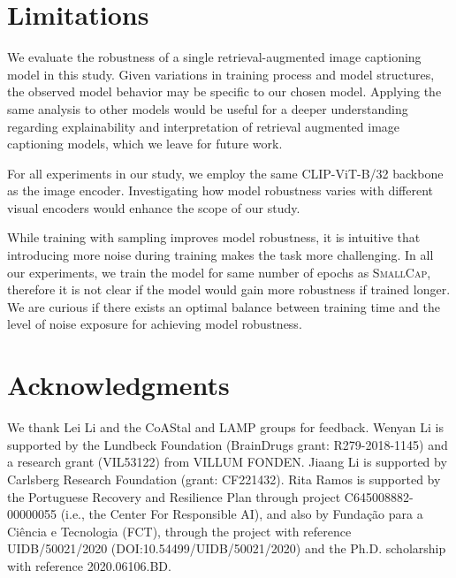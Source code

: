 \section*{Limitations}
We evaluate the robustness of a single retrieval-augmented image captioning model in this study. Given variations in training process and model structures, the observed model behavior may be specific to our chosen model. Applying the same analysis to other models  would be useful for a deeper understanding regarding explainability and interpretation of retrieval augmented image captioning models, which we leave for future work. 

For all experiments in our study, we employ the same  CLIP-ViT-B/32 backbone as the image encoder. Investigating how model robustness varies with different visual encoders would enhance the scope of our study.

While training with sampling improves model robustness, it is intuitive that introducing more noise during training makes the task more challenging. In all our experiments, we train the model for same number of epochs as \textsc{SmallCap}, therefore it is not clear if the model would gain more robustness if trained longer. We are curious if there exists an optimal balance between training time and the level of noise exposure for achieving model robustness.

\section*{Acknowledgments}
 We thank Lei Li and the CoAStal and LAMP groups for feedback. Wenyan Li is supported by the Lundbeck Foundation (BrainDrugs grant: R279-2018-1145) and  a research grant (VIL53122) from VILLUM FONDEN. Jiaang Li is supported by Carlsberg Research Foundation (grant: CF221432). Rita Ramos is supported by the Portuguese Recovery and Resilience Plan through project C645008882-00000055 (i.e., the Center For Responsible AI), and also by Funda\c{c}\~ao para a Ci\^encia e Tecnologia (FCT), through the project with reference UIDB/50021/2020 (DOI:10.54499/UIDB/50021/2020) and the Ph.D. scholarship with reference 2020.06106.BD.
